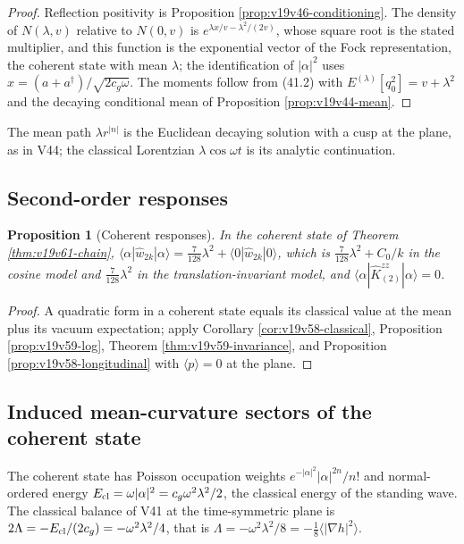 \documentclass[11pt]{article}
\newtheorem{proposition}[theorem]{Proposition}
\theoremstyle{remark}
\begin{document}
\begin{proof}
Reflection positivity is Proposition \ref{prop:v19v46-conditioning}.
The density of \(N(\lambda,v)\) relative to \(N(0,v)\) is
\(e^{\lambda x/v-\lambda^2/(2v)}\), whose square root is the stated
multiplier, and this function is the exponential vector of the Fock
representation, the coherent state with mean \(\lambda\); the
identification of \(|\alpha|^2\) uses \(x=(a+a^\dagger)/\sqrt{2c_g\omega}\).
The moments follow from (41.2) with \(E^{(\lambda)}[q_0^2]=v+\lambda^2\)
and the decaying conditional mean of Proposition
\ref{prop:v19v44-mean}.
\end{proof}

The mean path \(\lambda r^{|n|}\) is the Euclidean decaying solution
with a cusp at the plane, as in V44; the classical Lorentzian
\(\lambda\cos\omega t\) is its analytic continuation.

\subsection{Second-order responses}

\begin{proposition}[Coherent responses]
\label{prop:v19v61-response}
In the coherent state of Theorem \ref{thm:v19v61-chain},
\(\langle\alpha|\hat w_{2k}|\alpha\rangle=\tfrac7{128}\lambda^2+\langle0|\hat w_{2k}|0\rangle\),
which is \(\tfrac7{128}\lambda^2+C_0/k\) in the cosine model and
\(\tfrac7{128}\lambda^2\) in the translation-invariant model, and
\(\langle\alpha|\widehat K^{zz}_{(2)}|\alpha\rangle=0\).
\end{proposition}

\begin{proof}
A quadratic form in a coherent state equals its classical value at the
mean plus its vacuum expectation; apply Corollary
\ref{cor:v19v58-classical}, Proposition \ref{prop:v19v59-log}, Theorem
\ref{thm:v19v59-invariance}, and Proposition
\ref{prop:v19v58-longitudinal} with \(\langle p\rangle=0\) at the plane.
\end{proof}

\subsection{Induced mean-curvature sectors of the coherent state}

The coherent state has Poisson occupation weights
\(e^{-|\alpha|^2}|\alpha|^{2n}/n!\) and normal-ordered energy
\(E_{\rm cl}=\omega|\alpha|^2=c_g\omega^2\lambda^2/2\), the classical
energy of the standing wave.  The classical balance of V41 at the
time-symmetric plane is \(2\Lambda=-E_{\rm cl}/(2c_g)=-\omega^2\lambda^2/4\),
that is \(\Lambda=-\omega^2\lambda^2/8=-\tfrac18\langle|\nabla h|^2\rangle\).
\end{document}

